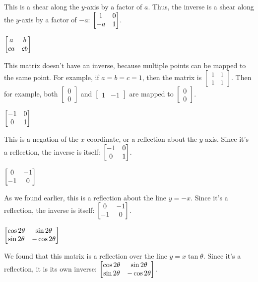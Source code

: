 \documentclass[../gatm_answers.tex]{subfiles}
\begin{document}
This is a shear along the $y$-axis by a factor of $a$. Thus, the inverse is a shear along the $y$-axis by a factor of $-a$: $\begin{bmatrix} 1 & 0 \\ -a & 1 \end{bmatrix}$.

\begin{inner_problem}
\item $\begin{bmatrix} a & b \\ ca & cb \end{bmatrix}$
\end{inner_problem}

This matrix doesn't have an inverse, because multiple points can be mapped to the same point. For example, if $a=b=c=1$, then the matrix is $\begin{bmatrix} 1 & 1 \\ 1 & 1 \end{bmatrix}$. Then for example, both $\begin{bmatrix} 0 \\ 0 \end{bmatrix}$ and $\begin{bmatrix} 1 & -1 \end{bmatrix}$ are mapped to $\begin{bmatrix} 0 \\ 0 \end{bmatrix}$.

\begin{inner_problem}
\item $\begin{bmatrix} -1 & 0 \\ 0 & 1 \end{bmatrix}$ \label{prob:highlighted_example_list_transformations1}
\end{inner_problem}

This is a negation of the $x$ coordinate, or a reflection about the $y$-axis. Since it's a reflection, the inverse is itself: $\begin{bmatrix} -1 & 0 \\ 0 & 1 \end{bmatrix}$.

\begin{inner_problem}
\item $\begin{bmatrix} 0 & -1 \\ -1 & 0 \end{bmatrix}$ \label{prob:highlighted_example_list_transformations2}
\end{inner_problem}

As we found earlier, this is a reflection about the line $y=-x$. Since it's a reflection, the inverse is itself: $\begin{bmatrix} 0 & -1 \\ -1 & 0 \end{bmatrix}$.

\begin{inner_problem}
\item $\begin{bmatrix} \cos 2\theta & \sin 2\theta \\ \sin 2\theta & -\cos 2\theta \end{bmatrix}$ \label{prob:list_transformations_part_end}
\end{inner_problem}

We found that this matrix is a reflection over the line $y=x\tan\theta$. Since it's a reflection, it is its own inverse: $\begin{bmatrix} \cos 2\theta & \sin 2\theta \\ \sin 2\theta & -\cos 2\theta \end{bmatrix}$.
\end{document}

